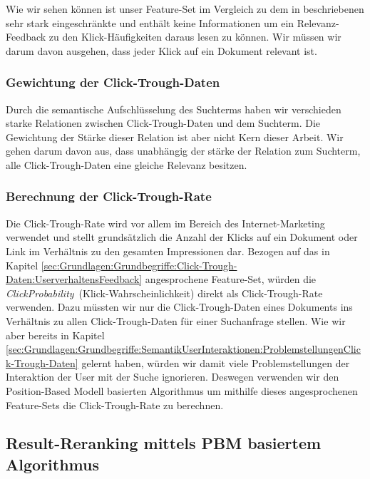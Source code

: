 Wie wir sehen können ist unser Feature-Set im Vergleich zu dem in \cite{IWUSBI} beschriebenen sehr stark eingeschränkte und enthält keine Informationen um ein Relevanz-Feedback zu den Klick-Häufigkeiten daraus lesen zu können. Wir müssen wir darum davon ausgehen, dass jeder Klick auf ein Dokument relevant ist.

\subsubsection{Gewichtung der Click-Trough-Daten}
\label{sec:Reranking:Methodik:Click-Trough-Daten:Gewichtung}

Durch die semantische Aufschlüsselung des Suchterms haben wir verschieden starke Relationen zwischen Click-Trough-Daten und dem Suchterm. Die Gewichtung der Stärke dieser Relation ist aber nicht Kern dieser Arbeit. Wir gehen darum davon aus, dass unabhängig der stärke der Relation zum Suchterm, alle Click-Trough-Daten eine gleiche Relevanz besitzen.

\subsubsection{Berechnung der Click-Trough-Rate}
\label{sec:Reranking:Methodik:Click-Trough-Daten:Gewichtung}

Die Click-Trough-Rate wird vor allem im Bereich des Internet-Marketing verwendet und stellt grundsätzlich die Anzahl der Klicks auf ein Dokument oder Link im Verhältnis zu den gesamten Impressionen dar. Bezogen auf das in Kapitel \ref{sec:Grundlagen:Grundbegriffe:Click-Trough-Daten:UserverhaltensFeedback} angesprochene Feature-Set, würden die \textit{ClickProbability}~(Klick-Wahrscheinlichkeit) direkt als Click-Trough-Rate verwenden. Dazu müssten wir nur die Click-Trough-Daten eines Dokuments ins Verhältnis zu allen Click-Trough-Daten für einer Suchanfrage stellen. Wie wir aber bereits in Kapitel \ref{sec:Grundlagen:Grundbegriffe:SemantikUserInteraktionen:ProblemstellungenClick-Trough-Daten} gelernt haben, würden wir damit viele Problemstellungen der Interaktion der User mit der Suche ignorieren. Deswegen verwenden wir den Position-Based Modell basierten Algorithmus um mithilfe dieses angesprochenen Feature-Sets die Click-Trough-Rate zu berechnen.

\subsection{Result-Reranking mittels PBM basiertem Algorithmus}
\label{sec:Reranking:Methodik:Result-RerankingPBM}

